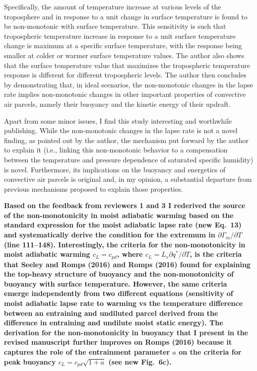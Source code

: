 \documentclass{article}
\begin{document}
Specifically, the amount of temperature increase at various levels of the troposphere and in response to a unit change in surface temperature is found to be non-monotonic with surface temperature. This sensitivity is such that tropospheric temperature increase in response to a unit surface temperature change is maximum at a specific surface temperature, with the response being smaller at colder or warmer surface temperature values. The author also shows that the surface temperature value that maximizes the tropospheric temperature response is different for different tropospheric levels. The author then concludes by demonstrating that, in ideal scenarios, the non-monotonic changes in the lapse rate implies non-monotonic changes in other important properties of convective air parcels, namely their buoyancy and the kinetic energy of their updraft.

Apart from some minor issues, I find this study interesting and worthwhile publishing. While the non-monotonic changes in the lapse rate is not a novel finding, as pointed out by the author, the mechanism put forward by the author to explain it (i.e., linking this non-monotonic behavior to a compensation between the temperature and pressure dependence of saturated specific humidity) is novel. Furthermore, its implications on the buoyancy and energetics of convective air parcels is original and, in my opinion, a substantial departure from previous mechanisms proposed to explain those properties.

\textbf{Based on the feedback from reviewers 1 and 3 I rederived the source of the non-monotonicity in moist adiabatic warming based on the standard expression for the moist adiabatic lapse rate (new Eq.~13) and systematically derive the condition for the extremum in $\partial\Gamma_m/\partial T$ (line 111--148). Interestingly, the criteria for the non-monotonicity in moist adiabatic warming $c_L=c_{pd}$, where $c_L=L_v\partial q^* / \partial T$, is the criteria that Seeley and Romps (2016) and Romps (2016) found for explaining the top-heavy structure of buoyancy and the non-monotonicity of buoyancy with surface temperature. However, the same criteria emerge independently from two different equations (sensitivity of moist adiabatic lapse rate to warming vs the temperature difference between an entraining and undiluted parcel derived from the difference in entraining and undilute moist static energy). The derivation for the non-monotonicity in buoyancy that I present in the revised manuscript further improves on Romps (2016) because it captures the role of the entrainment parameter $a$ on the criteria for peak buoyancy $c_L=c_{pd}\sqrt{1+a}$ (see new Fig.~6c).}
\end{document}
